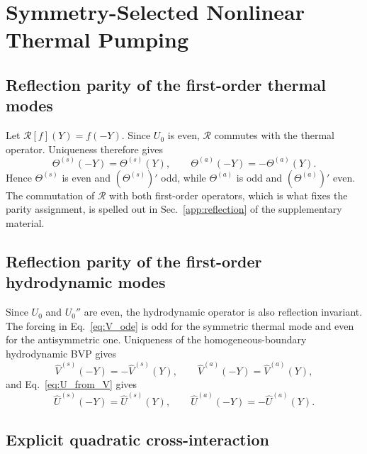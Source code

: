 \documentclass[12pt,a4paper]{article}
\begin{document}
\section{Symmetry-Selected Nonlinear Thermal Pumping}
\label{sec:symmetry_law}

\subsection{Reflection parity of the first-order thermal modes}

Let $\mathcal R[f](Y)=f(-Y)$. Since $U_0$ is even, $\mathcal R$ commutes with the thermal operator.
Uniqueness therefore gives
\begin{equation}
  \Theta^{(s)}(-Y)=\Theta^{(s)}(Y),\qquad
  \Theta^{(a)}(-Y)=-\Theta^{(a)}(Y).
  \label{eq:thermal_parity}
\end{equation}
Hence $\Theta^{(s)}$ is even and $(\Theta^{(s)})'$ odd, while $\Theta^{(a)}$ is odd and
$(\Theta^{(a)})'$ even. The commutation of $\mathcal R$ with both first-order operators,
which is what fixes the parity assignment, is spelled out
in Sec.~\ref{app:reflection} of the supplementary material.

\subsection{Reflection parity of the first-order hydrodynamic modes}

Since $U_0$ and $U_0''$ are even, the hydrodynamic operator is also reflection invariant. The forcing
in Eq.~\eqref{eq:V_ode} is odd for the symmetric thermal mode and even for the antisymmetric one.
Uniqueness of the homogeneous-boundary hydrodynamic BVP gives
\begin{equation}
  \widehat V^{(s)}(-Y)=-\widehat V^{(s)}(Y),\qquad
  \widehat V^{(a)}(-Y)=\widehat V^{(a)}(Y),
  \label{eq:V_parity}
\end{equation}
and Eq.~\eqref{eq:U_from_V} gives
\begin{equation}
  \widehat U^{(s)}(-Y)=\widehat U^{(s)}(Y),\qquad
  \widehat U^{(a)}(-Y)=-\widehat U^{(a)}(Y).
  \label{eq:U_parity}
\end{equation}

\subsection{Explicit quadratic cross-interaction}
\label{subsec:cross_forcing}
\end{document}
